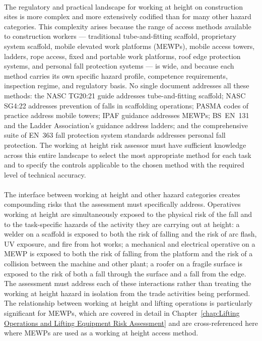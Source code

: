 \paragraph{}
The regulatory and practical landscape for working at height on construction sites is more complex and more extensively codified than for many other hazard categories. This complexity arises because the range of access methods available to construction workers --- traditional tube-and-fitting scaffold, proprietary system scaffold, mobile elevated work platforms (MEWPs), mobile access towers, ladders, rope access, fixed and portable work platforms, roof edge protection systems, and personal fall protection systems --- is wide, and because each method carries its own specific hazard profile, competence requirements, inspection regime, and regulatory basis. No single document addresses all these methods: the NASC TG20:21 guide addresses tube-and-fitting scaffold; NASC SG4:22 addresses prevention of falls in scaffolding operations; PASMA codes of practice address mobile towers; IPAF guidance addresses MEWPs; BS~EN~131 and the Ladder Association's guidance address ladders; and the comprehensive suite of EN~363 fall protection system standards addresses personal fall protection. The working at height risk assessor must have sufficient knowledge across this entire landscape to select the most appropriate method for each task and to specify the controls applicable to the chosen method with the required level of technical accuracy.

\paragraph{}
The interface between working at height and other hazard categories creates compounding risks that the assessment must specifically address. Operatives working at height are simultaneously exposed to the physical risk of the fall and to the task-specific hazards of the activity they are carrying out at height: a welder on a scaffold is exposed to both the risk of falling and the risk of arc flash, UV exposure, and fire from hot works; a mechanical and electrical operative on a MEWP is exposed to both the risk of falling from the platform and the risk of a collision between the machine and other plant; a roofer on a fragile surface is exposed to the risk of both a fall through the surface and a fall from the edge. The assessment must address each of these interactions rather than treating the working at height hazard in isolation from the trade activities being performed. The relationship between working at height and lifting operations is particularly significant for MEWPs, which are covered in detail in Chapter~\ref{chap:Lifting Operations and Lifting Equipment Risk Assessment} and are cross-referenced here where MEWPs are used as a working at height access method.

